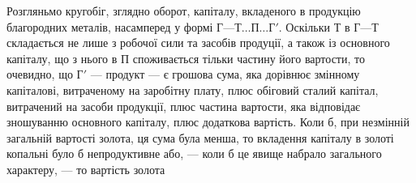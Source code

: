 Розгляньмо кругобіг, зглядно оборот, капіталу, вкладеного в продукцію
благородних металів, насамперед у формі $Г — Т\dots{} П\dots{} Г'$. Оскільки
$Т$ в $Г — Т$ складається не лише з робочої сили та засобів продуції, а також
із основного капіталу, що з нього в $П$ споживається тільки частину
його вартости, то очевидно, що $Г'$ — продукт — є грошова сума, яка
дорівнює змінному капіталові, витраченому на заробітну плату, плюс обіговий
сталий капітал, витрачений на засоби продукції, плюс частина
вартости, яка відповідає зношуванню основного капіталу, плюс додаткова
вартість. Коли б, при незмінній загальній вартості золота, ця сума була
менша, то вкладення капіталу в золоті копальні було б непродуктивне
або, — коли б це явище набрало загального характеру, — то вартість золота
\parbreak{}  %
